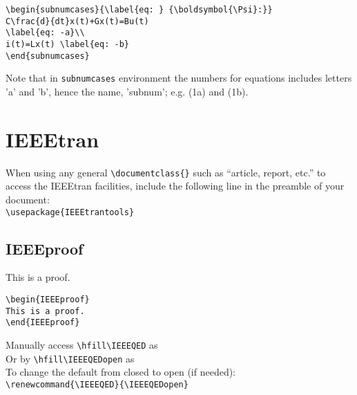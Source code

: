 \documentclass[journal]{IEEEtran}
\begin{document}
\begin{verbatim}
\begin{subnumcases}{\label{eq: } {\boldsymbol{\Psi}:}}
C\frac{d}{dt}x(t)+Gx(t)=Bu(t)
\label{eq: -a}\\
i(t)=Lx(t) \label{eq: -b}
\end{subnumcases}
\end{verbatim}

Note that in \texttt{subnumcases} environment the numbers for equations includes letters 'a' and 'b', hence the name, 'subnum'; e.g. (1a) and (1b). 

\newpage
\noindent \dotfill
\section{IEEEtran}
When using any general \verb!\documentclass{}! such as ``article, report, etc.'' to access the
IEEEtran facilities, include the following line in the preamble of your document:\\
\verb!\usepackage{IEEEtrantools}!

\subsection{IEEEproof}
\begin{IEEEproof}
This is a proof.
\end{IEEEproof}

\begin{verbatim}
\begin{IEEEproof}
This is a proof.
\end{IEEEproof}
\end{verbatim}
Manually access \verb!\hfill\IEEEQED! as \hfill\IEEEQED\\
Or by \verb!\hfill\IEEEQEDopen! as \hfill\IEEEQEDopen\\[4pt]

\noindent To change the default from closed to open (if needed):\\
\verb!\renewcommand{\IEEEQED}{\IEEEQEDopen}!

\par \noindent \dotfill
\end{document}
